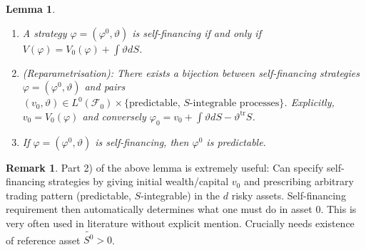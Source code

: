 \documentclass[12pt,a4paper, twoside]{article}
\newtheorem{lem}{Lemma}[section]
\theoremstyle{definition}
\newtheorem{rem}{Remark}[section]
\begin{document}
\newpage
\begin{lem} \label{L01} \
\begin{enumerate}
\item A strategy $\varphi=( \varphi^0, \vartheta)$ is self-financing if and only if  $V( \varphi) = V_0( \varphi) + \int \vartheta dS$. 
\item (Reparametrisation): There exists a bijection between self-financing strategies $\varphi = ( \varphi^0, \vartheta)$ and pairs $(v_0, \vartheta) \in L^0( \mathcal{F}_0) \times \{\text{predictable, $S$-integrable processes}\}$. Explicitly, $v_0= V_0( \varphi)$ and conversely $\varphi_0= v_0 + \int \vartheta dS - \vartheta^{\text{tr}}S$.
\item If $\varphi= ( \varphi^0, \vartheta)$ is self-financing, then $\varphi^0$ is predictable. 
\end{enumerate}
\end{lem}
\begin{rem} Part 2) of the above lemma is extremely useful: Can specify self-financing strategies by giving initial wealth/capital $v_0$ and prescribing arbitrary trading pattern (predictable, $S$-integrable) in the $d$ risky assets. Self-financing requirement then automatically determines what one must do in asset $0$. This is very often used in literature without explicit mention. Crucially needs existence of reference asset $\widetilde{S^0} >0$. 
\end{rem}
\end{document}
